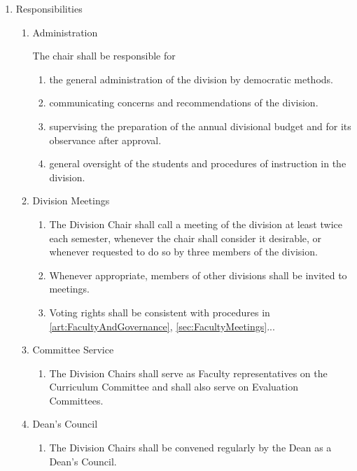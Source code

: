 \documentclass{manual}
\newcommand{\itemLevelA}{\alph*.}
\newcommand{\itemLevelB}{\arabic*)}
\newcommand{\itemLevelC}{\alph*)}
\newcommand{\itemRefA}{\alph*}
\newcommand{\itemRefB}{\arabic*}
\newcommand{\itemRefC}{\alph*}
\begin{document}
\begin{enumerate}[label=\itemLevelA,ref=\itemRefA]
\item \label{item:responsibilities01} Responsibilities
\begin{enumerate}[label=\itemLevelB,ref=\itemRefB]
\item Administration

The chair shall be responsible for
\begin{enumerate}[label=\itemLevelC,ref=\itemRefC]
\item the general administration of the division by democratic methods.
\item communicating concerns and recommendations of the division.
\item supervising the preparation of the annual divisional budget and for its observance after approval. 
\item general oversight of the students and procedures of instruction in the division.
\end{enumerate}

\item Division Meetings
\begin{enumerate}[label=\itemLevelC,ref=\itemRefC]
\item The Division Chair shall call a meeting of the division at least twice each semester, whenever the chair shall consider it desirable, or whenever requested to do so by three members of the division.
\item Whenever appropriate, members of other divisions shall be invited to meetings.
\item Voting rights shall be consistent with procedures in \cref{art:FacultyAndGovernance}, \cref{sec:FacultyMeetings}...
\end{enumerate}

\item Committee Service
\begin{enumerate}[label=\itemLevelC,ref=\itemRefC]
\item The Division Chairs shall serve as Faculty representatives on the Curriculum Committee and shall also serve on Evaluation Committees. 
\end{enumerate}

\item \label{iitem:deansCouncil02} Dean's Council
\begin{enumerate}[label=\itemLevelC,ref=\itemRefC]
\item The Division Chairs shall be convened regularly by the Dean as a Dean's Council.


\end{enumerate}
\end{enumerate}
\end{enumerate}
\end{document}
